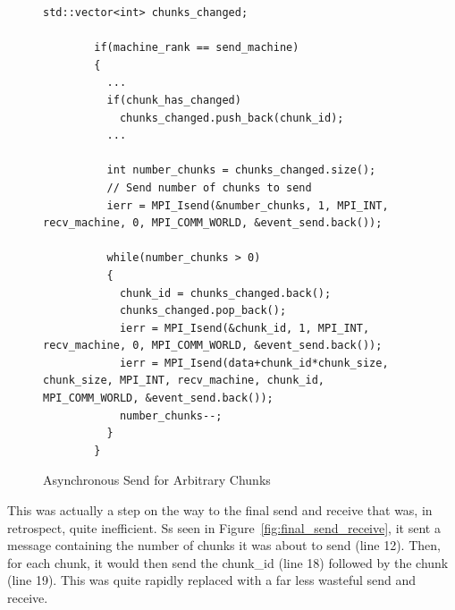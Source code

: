 \documentclass[../thesis.tex]{subfiles}
\begin{document}
    \begin{figure}[htbp]
      \centering

      \lstset{language=cpp}  
      \begin{lstlisting}[tabsize=2]
        std::vector<int> chunks_changed;

        if(machine_rank == send_machine)
        {
          ...
          if(chunk_has_changed)
            chunks_changed.push_back(chunk_id);
          ...

          int number_chunks = chunks_changed.size();
          // Send number of chunks to send
          ierr = MPI_Isend(&number_chunks, 1, MPI_INT, recv_machine, 0, MPI_COMM_WORLD, &event_send.back());

          while(number_chunks > 0)
          {
            chunk_id = chunks_changed.back();
            chunks_changed.pop_back();
            ierr = MPI_Isend(&chunk_id, 1, MPI_INT, recv_machine, 0, MPI_COMM_WORLD, &event_send.back());
            ierr = MPI_Isend(data+chunk_id*chunk_size, chunk_size, MPI_INT, recv_machine, chunk_id, MPI_COMM_WORLD, &event_send.back());
            number_chunks--;
          }
        }
        \end{lstlisting}

      \caption{Asynchronous Send for Arbitrary Chunks}
      \label{fig:async_send_of_arbitrary_chunks}
    \end{figure}

    This was actually a step on the way to the final send and receive that was, in retrospect, quite inefficient. Ss seen in Figure~\ref{fig:final_send_receive}, it sent a message containing the number of chunks it was about to send (line 12). Then, for each chunk, it would then send the chunk\_id (line 18) followed by the chunk (line 19). This was quite rapidly replaced with a far less wasteful send and receive.
\end{document}
